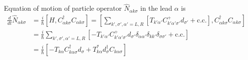 \documentclass[11pt,a4paper]{article}
\begin{document}
Equation of motion of particle operator $\hat{N}_{\alpha k\sigma}$ in the lead $\alpha$ is
\begin{equation}
\begin{split}
\frac{d}{dt}\hat{N}_{\alpha k\sigma} &= \frac{i}{\hbar}[H, C_{\alpha k\sigma}^{\dag}C_{\alpha k\sigma}] = \left[\sum_{k', \sigma', \alpha'=L, R}\left[T_{k' \alpha'} C_{k' \alpha' \sigma'}^{+} d_{\sigma'}+\mathrm{c.c.}\right], C_{\alpha k\sigma}^{\dag}C_{\alpha k\sigma}\right]\\
&=\frac{i}{\hbar}\sum_{k', \sigma', \alpha'=L, R}\left[ -T_{k' \alpha'} C_{k' \alpha' \sigma'}^{+} d_{\sigma'}\delta_{\alpha\alpha'}\delta_{kk'}\delta_{\sigma\sigma'}+\mathrm{c.c.}\right]\\
&=\frac{i}{\hbar}[-T_{k \alpha} C_{k \alpha \sigma}^{\dag} d_{\sigma} + T_{k \alpha}^{*} d_{\sigma}^{\dag}C_{k \alpha \sigma}]
\end{split}
\end{equation}
\end{document}
